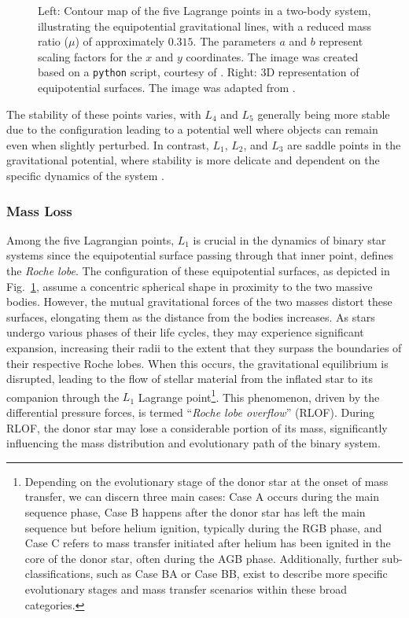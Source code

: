 \documentclass[main.tex]{subfiles}
\begin{document}
\begin{figure}[t!]
\begin{subfigure}{0.535\textwidth}
         \end{subfigure}
         \caption{Left: Contour map of the five Lagrange points in a two-body system, illustrating the equipotential gravitational lines, with a reduced mass ratio ($\mu$) of approximately $0.315$. The parameters $a$ and $b$ represent scaling factors for the $x$ and $y$ coordinates. The image was created based on a \texttt{python} script, courtesy of \cite{Zingale}.
         Right: 3D representation of equipotential surfaces. The image was adapted from \cite{Sluijs}.}
         \label{fig:eq_sur}
    \end{figure}

    The stability of these points varies, with $L_4$ and $L_5$ generally being more stable due to the configuration leading to a potential well where objects can remain even when slightly perturbed. In contrast, $L_1$, $L_2$, and $L_3$ are saddle points in the gravitational potential, where stability is more delicate and dependent on the specific dynamics of the system \citep[e.g.,][]{Szebehely, Celletti1990, Schwarz2012}. 

    \subsubsection{Mass Loss}
    Among the five Lagrangian points, $L_1$ is crucial in the dynamics of binary star systems since the equipotential surface passing through that inner point, defines the \textit{Roche lobe}. The configuration of these equipotential surfaces, as depicted in Fig.~\ref{fig:eq_sur}, assume a concentric spherical shape in proximity to the two massive bodies. However, the mutual gravitational forces of the two masses distort these surfaces, elongating them as the distance from the bodies increases. As stars undergo various phases of their life cycles, they may experience significant expansion, increasing their radii to the extent that they surpass the boundaries of their respective Roche lobes. When this occurs, the gravitational equilibrium is disrupted, leading to the flow of stellar material from the inflated star to its companion through the $L_1$ Lagrange point\footnote{Depending on the evolutionary stage of the donor star at the onset of mass transfer, we can discern three main cases: Case A occurs during the main sequence phase, Case B happens after the donor star has left the main sequence but before helium ignition, typically during the RGB phase, and Case C refers to mass transfer initiated after helium has been ignited in the core of the donor star, often during the AGB phase. Additionally, further sub-classifications, such as Case BA or Case BB, exist to describe more specific evolutionary stages and mass transfer scenarios within these broad categories.}. This phenomenon, driven by the differential pressure forces, is termed ``\textit{Roche lobe overflow}'' (RLOF). During RLOF, the donor star may lose a considerable portion of its mass, significantly influencing the mass distribution and evolutionary path of the binary system.
\end{document}
